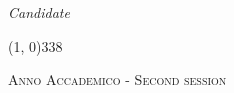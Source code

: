 \begin{titlepage}
\begin{center}
\begin{large}
\vspace{0pt} 

\begin{flushright}
\textit{Candidate}\\
\vspace{5pt} 
\myName
\end{flushright}
\end{large}

\vspace{20pt}

\line(1, 0){338} \\
\begin{normalsize}
\textsc{Anno Accademico \myAA - Second session}
\end{normalsize}

\end{center}
    \end{titlepage}